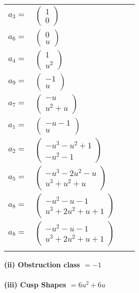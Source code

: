 \documentclass[1p]{elsarticle_modified}
\theoremstyle{definition}
\begin{document}
\begin{tabular}{m{7pt} m{180pt} m{7pt} m{180pt} }
\flushright $a_{3}=$&$\begin{pmatrix}1\\0\end{pmatrix}$ \\
\flushright $a_{6}=$&$\begin{pmatrix}0\\u\end{pmatrix}$ \\
\flushright $a_{4}=$&$\begin{pmatrix}1\\u^2\end{pmatrix}$ \\
\flushright $a_{9}=$&$\begin{pmatrix}-1\\u\end{pmatrix}$ \\
\flushright $a_{7}=$&$\begin{pmatrix}- u\\u^2+u\end{pmatrix}$ \\
\flushright $a_{1}=$&$\begin{pmatrix}- u-1\\u\end{pmatrix}$ \\
\flushright $a_{2}=$&$\begin{pmatrix}- u^3- u^2+1\\- u^2-1\end{pmatrix}$ \\
\flushright $a_{5}=$&$\begin{pmatrix}- u^3-2 u^2- u\\u^3+u^2+u\end{pmatrix}$ \\
\flushright $a_{8}=$&$\begin{pmatrix}- u^2- u-1\\u^3+2 u^2+u+1\end{pmatrix}$\\ \flushright $a_{8}=$&$\begin{pmatrix}- u^2- u-1\\u^3+2 u^2+u+1\end{pmatrix}$\\&\end{tabular}
\flushleft \textbf{(ii) Obstruction class $= -1$}\\~\\
\flushleft \textbf{(iii) Cusp Shapes $= 6 u^2+6 u$}\\~\\
\end{document}
